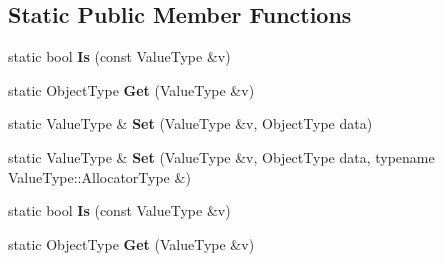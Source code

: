 \subsection*{Static Public Member Functions}
\begin{DoxyCompactItemize}
\item 
static bool {\bfseries Is} (const Value\+Type \&v)\hypertarget{structinternal_1_1_type_helper_3_01_value_type_00_01typename_01_value_type_1_1_object_01_4_a6c8bcb7479d2c4c96ae6dcaac808e227}{}\label{structinternal_1_1_type_helper_3_01_value_type_00_01typename_01_value_type_1_1_object_01_4_a6c8bcb7479d2c4c96ae6dcaac808e227}

\item 
static Object\+Type {\bfseries Get} (Value\+Type \&v)\hypertarget{structinternal_1_1_type_helper_3_01_value_type_00_01typename_01_value_type_1_1_object_01_4_ae1debd6b9c125d4206e43a74ddbd0795}{}\label{structinternal_1_1_type_helper_3_01_value_type_00_01typename_01_value_type_1_1_object_01_4_ae1debd6b9c125d4206e43a74ddbd0795}

\item 
static Value\+Type \& {\bfseries Set} (Value\+Type \&v, Object\+Type data)\hypertarget{structinternal_1_1_type_helper_3_01_value_type_00_01typename_01_value_type_1_1_object_01_4_a7655ed9b6c7443d99063ec20769b9984}{}\label{structinternal_1_1_type_helper_3_01_value_type_00_01typename_01_value_type_1_1_object_01_4_a7655ed9b6c7443d99063ec20769b9984}

\item 
static Value\+Type \& {\bfseries Set} (Value\+Type \&v, Object\+Type data, typename Value\+Type\+::\+Allocator\+Type \&)\hypertarget{structinternal_1_1_type_helper_3_01_value_type_00_01typename_01_value_type_1_1_object_01_4_a41825b964c6188a07539b7ab2e6ed194}{}\label{structinternal_1_1_type_helper_3_01_value_type_00_01typename_01_value_type_1_1_object_01_4_a41825b964c6188a07539b7ab2e6ed194}

\item 
static bool {\bfseries Is} (const Value\+Type \&v)\hypertarget{structinternal_1_1_type_helper_3_01_value_type_00_01typename_01_value_type_1_1_object_01_4_a6c8bcb7479d2c4c96ae6dcaac808e227}{}\label{structinternal_1_1_type_helper_3_01_value_type_00_01typename_01_value_type_1_1_object_01_4_a6c8bcb7479d2c4c96ae6dcaac808e227}

\item 
static Object\+Type {\bfseries Get} (Value\+Type \&v)\hypertarget{structinternal_1_1_type_helper_3_01_value_type_00_01typename_01_value_type_1_1_object_01_4_ae1debd6b9c125d4206e43a74ddbd0795}{}\label{structinternal_1_1_type_helper_3_01_value_type_00_01typename_01_value_type_1_1_object_01_4_ae1debd6b9c125d4206e43a74ddbd0795}


\end{DoxyCompactItemize}
